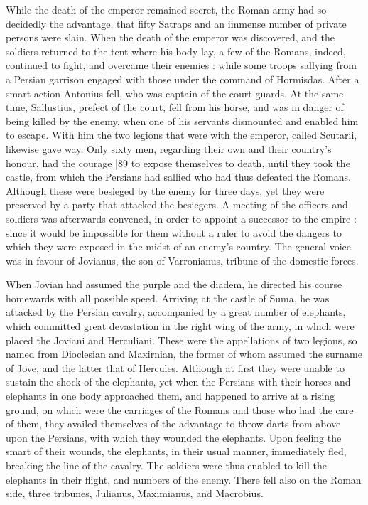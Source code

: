 While the death of the emperor remained secret, the Roman army had so decidedly the advantage, that fifty Satraps and an immense number of private persons were slain. When the death of the emperor was discovered, and the soldiers returned to the tent where his body lay, a few of the Romans, indeed, continued to fight, and overcame their enemies : while some troops sallying from a Persian garrison engaged with those under the command of Hormisdas. After a smart action Antonius fell, who was captain of the court-guards. At the same time, Sallustius, prefect of the court, fell from his horse, and was in danger of being killed by the enemy, when one of his servants dismounted and enabled him to escape. With him the two legions that were with the emperor, called Scutarii, likewise gave way. Only sixty men, regarding their own and their country's honour, had the courage
|89 to expose themselves to death, until they took the castle, from which the Persians had sallied who had thus defeated the Romans. Although these were besieged by the enemy for three days, yet they were preserved by a party that attacked the besiegers. A meeting of the officers and soldiers was afterwards convened, in order to appoint a successor to the empire : since it would be impossible for them without a ruler to avoid the dangers to which they were exposed in the midst of an enemy's country. The general voice was in favour of Jovianus, the son of Varronianus, tribune of the domestic forces.

When Jovian had assumed the purple and the diadem, he directed his course homewards with all possible speed. Arriving at the castle of Suma, he was attacked by the Persian cavalry, accompanied by a great number of elephants, which committed great devastation in the right wing of the army, in which were placed the Joviani and Herculiani. These were the appellations of two legions, so named from Dioclesian and Maxirnian, the former of whom assumed the surname of Jove, and the latter that of Hercules. Although at first they were unable to sustain the shock of the elephants, yet when the Persians with their horses and elephants in one body approached them, and happened to arrive at a rising ground, on which were the carriages of the Romans and those who had the care of them, they availed themselves of the advantage to throw darts from above upon the Persians, with which they wounded the elephants. Upon feeling the smart of their wounds, the elephants, in their usual manner, immediately fled, breaking the line of the cavalry. The soldiers were thus enabled to kill the elephants in their flight, and numbers of the enemy. There fell also on the Roman side, three tribunes, Julianus, Maximianus, and Macrobius.

